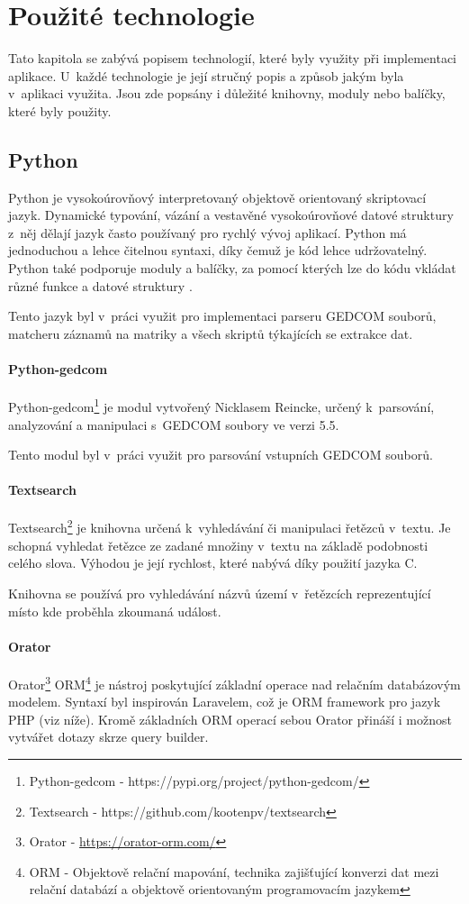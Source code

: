 \chapter{Použité technologie}
\label{technologie}
Tato kapitola se zabývá popisem technologií, které byly využity při implementaci aplikace. U~každé technologie je její stručný popis a způsob jakým byla v~aplikaci využita. Jsou zde popsány i důležité knihovny, moduly nebo balíčky, které byly použity.

\section{Python}
Python je vysokoúrovňový interpretovaný objektově orientovaný skriptovací jazyk. Dynamické typování, vázání a vestavěné vysokoúrovňové datové struktury z~něj dělají jazyk často používaný pro rychlý vývoj aplikací. Python má jednoduchou a lehce čitelnou syntaxi, díky čemuž je kód lehce udržovatelný. Python také podporuje moduly a balíčky, za pomocí kterých lze do kódu vkládat různé funkce a datové struktury \cite{python}. 

Tento jazyk byl v~práci využit pro implementaci parseru GEDCOM souborů, matcheru záznamů na matriky a všech skriptů týkajících se extrakce dat.
\subsubsection{Python-gedcom}
Python-gedcom\footnote{Python-gedcom - https://pypi.org/project/python-gedcom/} je modul vytvořený Nicklasem Reincke, určený k~parsování, analyzování a manipulaci s~GEDCOM soubory ve verzi 5.5. 

Tento modul byl v~práci využit pro parsování vstupních GEDCOM souborů.

\subsubsection{Textsearch}
Textsearch\footnote{Textsearch - https://github.com/kootenpv/textsearch} je knihovna určená k~vyhledávání či manipulaci řetězců v~textu. Je schopná vyhledat řetězce ze zadané množiny v~textu na základě podobnosti celého slova. Výhodou je její rychlost, které nabývá díky použití jazyka C.

Knihovna se používá pro vyhledávání názvů území v~řetězcích reprezentující místo kde proběhla zkoumaná událost.

\subsubsection{Orator}
Orator\footnote{Orator - \url{https://orator-orm.com/}} ORM\footnote{ORM - Objektově relační mapování, technika zajišťující konverzi dat mezi relační databází a objektově orientovaným programovacím jazykem} je nástroj poskytující základní operace nad relačním databázovým modelem. Syntaxí byl inspirován Laravelem, což je ORM framework pro jazyk PHP (viz níže). Kromě základních ORM operací sebou Orator přináší i možnost vytvářet dotazy skrze query builder.

